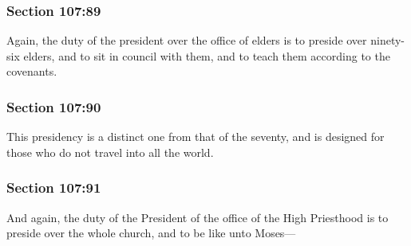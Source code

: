 	\subsubsection{Section 107:89} %
		\label{DC107-89}

		Again, the duty of the president over the office of elders is to preside over ninety-six elders, and to sit in council with them, and to teach them according to the covenants.


	\subsubsection{Section 107:90} %
		\label{DC107-90}

		This presidency is a distinct one from that of the seventy, and is designed for those who do not travel into all the world.


	\subsubsection{Section 107:91} %
		\label{DC107-91}

		And again, the duty of the President of the office of the High Priesthood is to preside over the whole church, and to be like unto Moses---


